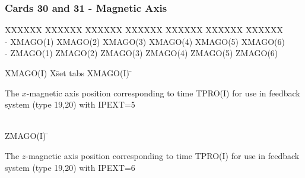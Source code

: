 \newpage \subsubsection{Cards 30 and 31 - Magnetic Axis}
\begin{tabbing}
XXXXXX \= XXXXXX \= XXXXXX \= XXXXXX \= XXXXXX \= XXXXXX \=
XXXXXX       \\
\footnotesize  - \>\footnotesize XMAGO(1)  \>\footnotesize XMAGO(2) \>\footnotesize
XMAGO(3) \>\footnotesize XMAGO(4) \>\footnotesize XMAGO(5) \>\footnotesize XMAGO(6)\\
\footnotesize  - \>\footnotesize ZMAGO(1)  \>\footnotesize ZMAGO(2) \>\footnotesize
ZMAGO(3) \>\footnotesize ZMAGO(4) \>\footnotesize ZMAGO(5) \>\footnotesize ZMAGO(6)
\end{tabbing}
\begin{tabbing}
XMAGO(I) X\=  set tabs \kill
XMAGO(I)  \=  \parbox[t]{\width}{The $x$-magnetic axis position corresponding to time
TPRO(I) for use in feedback system (type 19,20) with IPEXT=5}\\
ZMAGO(I)  \=  \parbox[t]{\width}{The $z$-magnetic axis position corresponding to time
TPRO(I) for use in feedback system (type 19,20) with IPEXT=6}
\end{tabbing}

